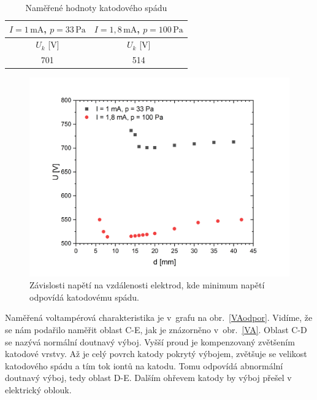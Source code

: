 \documentclass[a4paper,12pt]{article}
\begin{document}
	  


\begin{center}
	\begin{table}[h!]
		\centering
		\caption{Naměřené hodnoty katodového spádu}
		\label{tab2}
		\begin{tabular}{|c|c|} \hline
			$I = 1\,\si{\milli\ampere}$, $p = 33\,\si{\pascal}$ 
			& $I = 1,8\,\si{\milli\ampere}$, $p = 100\,\si{\pascal}$\\ \hline
			$U_k$ [V] & $U_k$ [V]\\ \hline
			701 & 514 \\ \hline
			
		\end{tabular}
	\end{table}
\end{center}

\begin{figure}[h!]
	\centering
	\includegraphics[width=145mm]{KatodovySpad.png}
	\caption{Závislosti napětí na vzdálenosti elektrod, kde minimum napětí odpovídá katodovému spádu.}
	\label{KatodovySpad}
\end{figure}

\newpage
Naměřená voltampérová charakteristika je v~grafu na obr.~\ref{VAodpor}. Vidíme, 
že se nám podařilo naměřit oblast C-E, jak je znázorněno v~obr.~\ref{VA}. Oblast C-D se nazývá normální doutnavý výboj. Vyšší proud je kompenzovaný zvětšením katodové vrstvy. Až je celý povrch katody pokrytý výbojem, zvětšuje se velikost katodového spádu a tím tok iontů na katodu. Tomu odpovídá abnormální doutnavý výboj, tedy oblast D-E. Dalším ohřevem katody by výboj přešel v elektrický oblouk.
\end{document}
